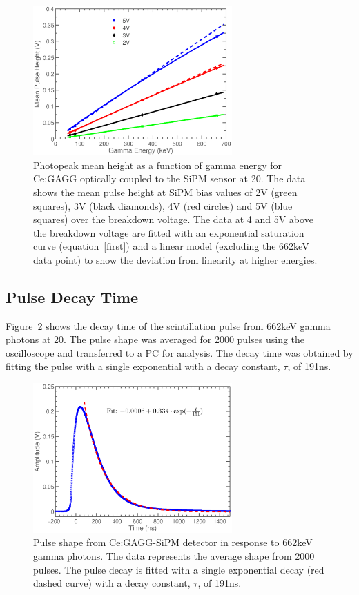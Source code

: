\documentclass[journal]{IEEEtran}
\begin{document}
\begin{figure}[tb]
\centering
\includegraphics[width=3in]{sat_curves.eps}
\caption{Photopeak mean height as a function of gamma energy for Ce:GAGG optically coupled to the SiPM sensor at 20\celsius{}. The data shows the mean pulse height at SiPM bias values of 2V (green squares), 3V (black diamonds), 4V (red circles) and 5V (blue squares) over the breakdown voltage. The data at 4 and 5V above the breakdown voltage are fitted with an exponential saturation curve (equation~\ref{first}) and a linear model (excluding the 662keV data point) to show the deviation from linearity at higher energies.}
\label{fig:saturation}
\end{figure}


\subsection{Pulse Decay Time}
Figure~\ref{fig:decay} shows the decay time of the scintillation pulse from 662keV gamma photons at 20\celsius{}. The pulse shape was averaged for 2000 pulses using the oscilloscope   and transferred to a PC for analysis. The decay time was obtained by fitting the pulse with a single exponential with a decay constant, $\tau$, of 191ns. 

\begin{figure}[tb]
\centering
\includegraphics[width=3in]{decay_curve_rt.eps}
\caption{Pulse shape from Ce:GAGG-SiPM detector in response to 662keV gamma photons. The data represents the average shape from 2000 pulses. The pulse decay is fitted with a single exponential decay (red dashed curve) with a decay constant, $\tau$, of 191ns. }
\label{fig:decay}
\end{figure}
\end{document}
